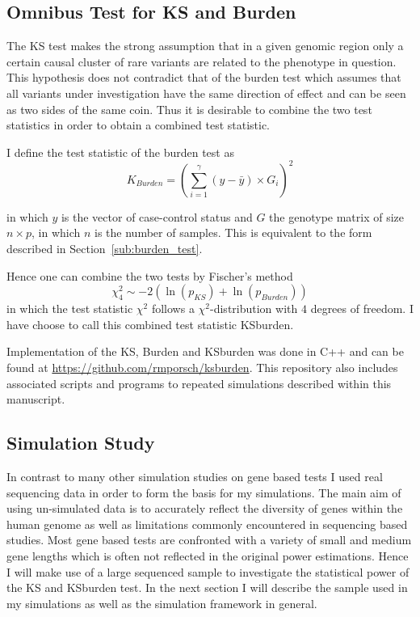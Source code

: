 \subsection{Omnibus Test for KS and Burden}
\label{sub:omnibus_test_for_ks_and_burden}

The KS test makes the strong assumption that in a given genomic region only a certain causal cluster of rare variants are related to the phenotype in question.
This hypothesis does not contradict that of the burden test which assumes that all variants under investigation have the same direction of effect and can be seen as two sides of the same coin.
Thus it is desirable to combine the two test statistics in order to obtain a combined test statistic.

I define the test statistic of the burden test as 
\begin{equation}\label{eq:burden_simple}
  K_{Burden} = {(\sum^\gamma_{i=1} (y-\bar{y}) \times G_i)}^2
\end{equation}

in which $y$ is the vector of case-control status and $G$ the genotype matrix of size $n \times p$, in which $n$ is the number of samples.
This is equivalent to the form described in Section~\ref{sub:burden_test}.

Hence one can combine the two tests by Fischer's method 
\begin{equation}
	\chi^2_4 \sim - 2 (\ln(p_{KS}) + \ln(p_{Burden}))
\end{equation}
in which the test statistic $\chi^2$ follows a $\chi^2$-distribution with $4$ degrees of freedom.
I have choose to call this combined test statistic KSburden.

Implementation of the KS, Burden and KSburden was done in C++ and can be found at \url{https://github.com/rmporsch/ksburden}.
This repository also includes associated scripts and programs to repeated simulations described within this manuscript.

\subsection{Simulation Study}
\label{sub:simulation_study}

In contrast to many other simulation studies on gene based tests I used real sequencing data in order to form the basis for my simulations.
The main aim of using un-simulated data is to accurately reflect the diversity of genes within the human genome as well as limitations commonly encountered in sequencing based studies.
Most gene based tests are confronted with a variety of small and medium gene lengths which is often not reflected in the original power estimations.
Hence I will make use of a large sequenced sample to investigate the statistical power of the KS and KSburden test.
In the next section I will describe the sample used in my simulations as well as the simulation framework in general.

